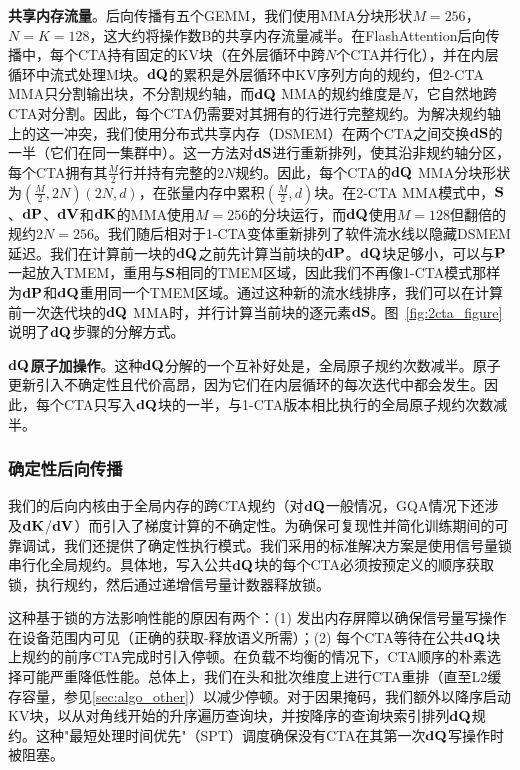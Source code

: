 \textbf{共享内存流量}。后向传播有五个GEMM，我们使用MMA分块形状$M=256$，$N=K=128$，这大约将操作数B的共享内存流量减半。在FlashAttention后向传播中，每个CTA持有固定的KV块（在外层循环中跨$N$个CTA并行化），并在内层循环中流式处理M块。$\mathbf{dQ}$的累积是外层循环中KV序列方向的规约，但2-CTA MMA只分割输出块，不分割规约轴，而$\mathbf{dQ}$ MMA的规约维度是$N$，它自然地跨CTA对分割。因此，每个CTA仍需要对其拥有的行进行完整规约。为解决规约轴上的这一冲突，我们使用分布式共享内存（DSMEM）在两个CTA之间交换$\mathbf{dS}$的一半（它们在同一集群中）。这一方法对$\mathbf{dS}$进行重新排列，使其沿非规约轴分区，每个CTA拥有其$\frac{M}{2}$行并持有完整的$2N$规约。因此，每个CTA的$\mathbf{dQ}$ MMA分块形状为$(\frac{M}{2}, 2N)(2N, d)$，在张量内存中累积$(\frac{M}{2}, d)$块。在2-CTA MMA模式中，$\mathbf{S}$、$\mathbf{dP}$、$\mathbf{dV}$和$\mathbf{dK}$的MMA使用$M=256$的分块运行，而$\mathbf{dQ}$使用$M=128$但翻倍的规约$2N=256$。我们随后相对于1-CTA变体重新排列了软件流水线以隐藏DSMEM延迟。我们在计算前一块的$\mathbf{dQ}$之前先计算当前块的$\mathbf{dP}$。$\mathbf{dQ}$块足够小，可以与$\mathbf{P}$一起放入TMEM，重用与$\mathbf{S}$相同的TMEM区域，因此我们不再像1-CTA模式那样为$\mathbf{dP}$和$\mathbf{dQ}$重用同一个TMEM区域。通过这种新的流水线排序，我们可以在计算前一次迭代块的$\mathbf{dQ}$ MMA时，并行计算当前块的逐元素$\mathbf{dS}$。图~\ref{fig:2cta_figure}说明了$\mathbf{dQ}$步骤的分解方式。

\textbf{$\mathbf{dQ}$原子加操作}。这种$\mathbf{dQ}$分解的一个互补好处是，全局原子规约次数减半。原子更新引入不确定性且代价高昂，因为它们在内层循环的每次迭代中都会发生。因此，每个CTA只写入$\mathbf{dQ}$块的一半，与1-CTA版本相比执行的全局原子规约次数减半。

\subsubsection{确定性后向传播}

我们的后向内核由于全局内存的跨CTA规约（对$\mathbf{dQ}$一般情况，GQA情况下还涉及$\mathbf{dK}$/$\mathbf{dV}$）而引入了梯度计算的不确定性。为确保可复现性并简化训练期间的可靠调试，我们还提供了确定性执行模式。我们采用的标准解决方案是使用信号量锁串行化全局规约。具体地，写入公共$\mathbf{dQ}$块的每个CTA必须按预定义的顺序获取锁，执行规约，然后通过递增信号量计数器释放锁。

这种基于锁的方法影响性能的原因有两个：(1) 发出内存屏障以确保信号量写操作在设备范围内可见（正确的获取-释放语义所需）；(2) 每个CTA等待在公共$\mathbf{dQ}$块上规约的前序CTA完成时引入停顿。在负载不均衡的情况下，CTA顺序的朴素选择可能严重降低性能。总体上，我们在头和批次维度上进行CTA重排（直至L2缓存容量，参见\cref{sec:algo_other}）以减少停顿。对于因果掩码，我们额外以降序启动KV块，以从对角线开始的升序遍历查询块，并按降序的查询块索引排列$\mathbf{dQ}$规约。这种"最短处理时间优先"（SPT）调度确保没有CTA在其第一次$\mathbf{dQ}$写操作时被阻塞。
